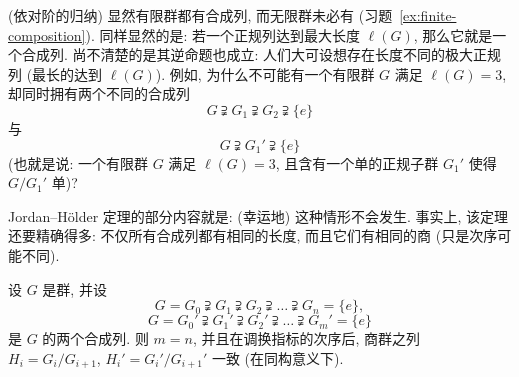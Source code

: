 (依对阶的归纳) 显然有限群都有合成列, 而无限群未必有 (习题~\ref{ex:finite-composition}). 同样显然的是: 若一个正规列达到最大长度 $\ell(G)$, 那么它就是一个合成列. 尚不清楚的是其逆命题也成立: 人们大可设想存在长度不同的极大正规列 (最长的达到 $\ell(G)$). 例如, 为什么不可能有一个有限群 $G$ 满足 $\ell(G) = 3$, 却同时拥有两个不同的合成列
\[
G \supsetneqq G_1 \supsetneqq G_2 \supsetneqq \{e\}
\]
与
\[
G \supsetneqq G_1' \supsetneqq \{e\}
\]
(也就是说: 一个有限群 $G$ 满足 $\ell(G) = 3$, 且含有一个单的正规子群 $G_1'$ 使得 $G/G_1'$ 单)?

Jordan--H\"older 定理的部分内容就是: (幸运地) 这种情形不会发生. 事实上, 该定理还要精确得多: 不仅所有合成列都有相同的长度, 而且它们有相同的商 (只是次序可能不同).

\begin{theorem}
\label{thm:jordan-holder}
设 $G$ 是群, 并设
\[
G = G_0 \supsetneqq G_1 \supsetneqq G_2 \supsetneqq \dots \supsetneqq G_n = \{e\},
\]
\[
G = G_0' \supsetneqq G_1' \supsetneqq G_2' \supsetneqq \dots \supsetneqq G_m' = \{e\}
\]
是 $G$ 的两个合成列. 则 $m = n$, 并且在调换指标的次序后, 商群之列 $H_i = G_i/G_{i+1}$, $H_i' = G_i'/G_{i+1}'$ 一致 (在同构意义下).
\end{theorem}

